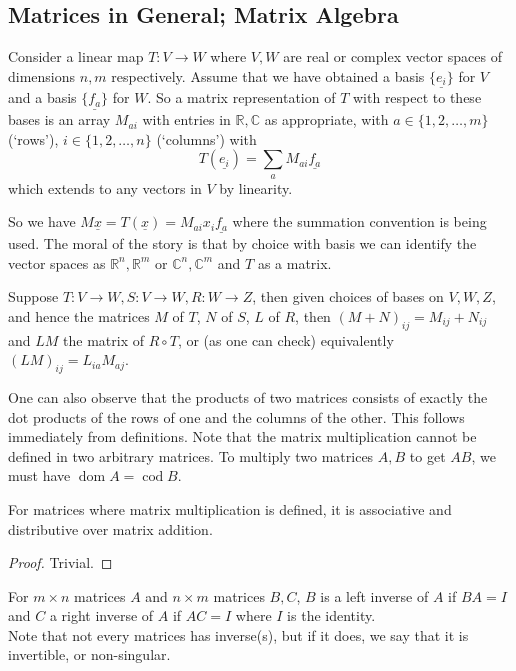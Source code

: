 \subsection{Matrices in General; Matrix Algebra}
\begin{definition}
    Consider a linear map $T:V\to W$ where $V,W$ are real or complex vector spaces of dimensions $n,m$ respectively.
    Assume that we have obtained a basis $\{\underline{e_i}\}$ for $V$ and a basis $\{\underline{f_a}\}$ for $W$.
    So a matrix representation of $T$ with respect to these bases is an array $M_{ai}$ with entries in $\mathbb R,\mathbb C$ as appropriate, with $a\in\{1,2,\ldots,m\}$ (`rows'), $i\in\{1,2,\ldots,n\}$ (`columns') with
    $$T(\underline{e_i})=\sum_{a}M_{ai}\underline{f_a}$$
    which extends to any vectors in $V$ by linearity.
\end{definition}
So we have $M\underline{x}=T(\underline{x})=M_{ai}x_i\underline{f_a}$ where the summation convention is being used.
The moral of the story is that by choice with basis we can identify the vector spaces as $\mathbb R^n,\mathbb R^m$ or $\mathbb C^n,\mathbb C^m$ and $T$ as a matrix.
\begin{definition}
    Suppose $T:V\to W, S:V\to W, R:W\to Z$, then given choices of bases on $V,W,Z$, and hence the matrices $M$ of $T$, $N$ of $S$, $L$ of $R$, then $(M+N)_{ij}=M_{ij}+N_{ij}$ and $LM$ the matrix of $R\circ T$, or (as one can check) equivalently $(LM)_{ij}=L_{ia}M_{aj}$.
\end{definition}
One can also observe that the products of two matrices consists of exactly the dot products of the rows of one and the columns of the other.
This follows immediately from definitions.
Note that the matrix multiplication cannot be defined in two arbitrary matrices.
To multiply two matrices $A,B$ to get $AB$, we must have $\operatorname{dom}A=\operatorname{cod}B$.
\begin{proposition}
    For matrices where matrix multiplication is defined, it is associative and distributive over matrix addition.
\end{proposition}
\begin{proof}
    Trivial.
\end{proof}
\begin{definition}
    For $m\times n$ matrices $A$ and $n\times m$ matrices $B,C$, $B$ is a left inverse of $A$ if $BA=I$ and $C$ a right inverse of $A$ if $AC=I$ where $I$ is the identity.\\
    Note that not every matrices has inverse(s), but if it does, we say that it is invertible, or non-singular.
\end{definition}
